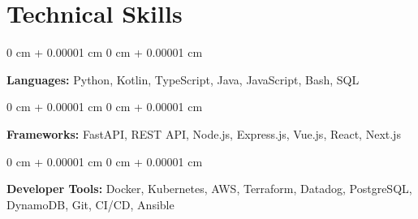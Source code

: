 \documentclass[10pt, letterpaper]{article}
\newenvironment{onecolentry}{
    \begin{adjustwidth}{
        0 cm + 0.00001 cm
    }{
        0 cm + 0.00001 cm
    }
}{
    \end{adjustwidth}
}
\begin{document}
    \vspace{0.10 cm}
    \section{Technical Skills}

    \begin{onecolentry}
        \textbf{Languages:} Python, Kotlin, TypeScript, Java, JavaScript, Bash, SQL
    \end{onecolentry}

    \vspace{0.1 cm}

    \begin{onecolentry}
        \textbf{Frameworks:} FastAPI, REST API, Node.js, Express.js, Vue.js, React, Next.js
    \end{onecolentry}

    \vspace{0.1 cm}

    \begin{onecolentry}
        \textbf{Developer Tools:} Docker, Kubernetes, AWS, Terraform, Datadog, PostgreSQL, DynamoDB, Git, CI/CD, Ansible
    \end{onecolentry}
\end{document}
